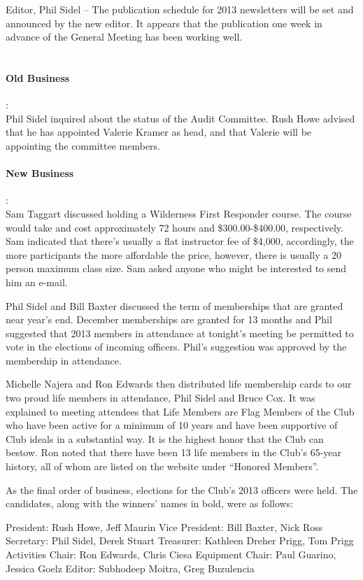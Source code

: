 \documentclass[10pt,a4paper]{article}
\begin{document}
\begin{multicols}{2}
Editor, Phil Sidel – The publication schedule for 2013 newsletters will be set and announced by the new editor.  It appears that the publication one week in advance of the General Meeting has been working well.
\\
\\
\paragraph{Old Business} :
\\
Phil Sidel inquired about the status of the Audit Committee.  Rush Howe advised that he has appointed Valerie Kramer as head, and that Valerie will be appointing the committee members.
\\
\paragraph{New Business} :
\\
Sam Taggart discussed holding a Wilderness First Responder course. The course would take and cost approximately 72 hours and \$300.00-\$400.00, respectively. Sam indicated that there's usually a flat instructor fee of \$4,000, accordingly, the more participants the more affordable the price, however, there is usually a 20 person maximum class size.  Sam asked anyone who might be interested to send him an e-mail.

Phil Sidel and Bill Baxter discussed the term of memberships that are granted near year's end. December memberships are granted for 13 months and Phil suggested that 2013 members in attendance at tonight's meeting be permitted to vote in the elections of incoming officers.  Phil's suggestion was approved by the membership in attendance.

Michelle Najera and Ron Edwards then distributed life membership cards to our two proud life members in attendance, Phil Sidel and Bruce Cox.  It was explained to meeting attendees that Life Members are Flag Members of the Club who have been active for a minimum of 10 years and have been supportive of Club ideals in a substantial way.  It is the highest honor that the Club can bestow.  Ron noted that there have been 13 life members in the Club's 65-year history, all of whom are listed on the website under “Honored Members”.

As the final order of business, elections for the Club's 2013 officers were held.  The candidates, along with the winners' names in bold, were as follows:

President:	Rush Howe, Jeff Maurin
Vice President:	Bill Baxter, Nick Ross
Secretary:	Phil Sidel, Derek Stuart
Treasurer:	Kathleen Dreher Prigg, Tom Prigg
Activities Chair:	Ron Edwards, Chris Ciesa
Equipment Chair:	Paul Guarino, Jessica Goelz
Editor:		Subhodeep Moitra, Greg Buzulencia


\end{multicols}
\end{document}
